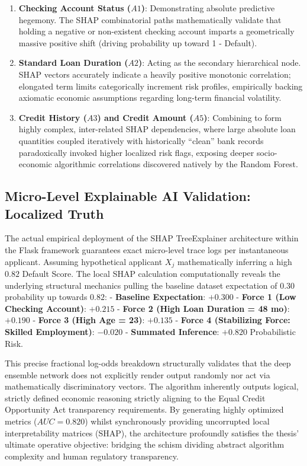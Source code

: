 \begin{enumerate}
\def\labelenumi{\arabic{enumi}.}
\tightlist
\item
  \textbf{Checking Account Status (\(A1\))}: Demonstrating absolute
  predictive hegemony. The SHAP combinatorial paths mathematically
  validate that holding a negative or non-existent checking account
  imparts a geometrically massive positive shift (driving probability up
  toward 1 - Default).
\item
  \textbf{Standard Loan Duration (\(A2\))}: Acting as the secondary
  hierarchical node. SHAP vectors accurately indicate a heavily positive
  monotonic correlation; elongated term limits categorically increment
  risk profiles, empirically backing axiomatic economic assumptions
  regarding long-term financial volatility.
\item
  \textbf{Credit History (\(A3\)) and Credit Amount (\(A5\))}: Combining
  to form highly complex, inter-related SHAP dependencies, where large
  absolute loan quantities coupled iteratively with historically
  ``clean'' bank records paradoxically invoked higher localized risk
  flags, exposing deeper socio-economic algorithmic correlations
  discovered natively by the Random Forest.
\end{enumerate}

\hypertarget{micro-level-explainable-ai-validation-localized-truth}{%
\subsection{Micro-Level Explainable AI Validation: Localized
Truth}\label{micro-level-explainable-ai-validation-localized-truth}}

The actual empirical deployment of the SHAP TreeExplainer architecture
within the Flask framework guarantees exact micro-level trace logs per
instantaneous applicant. Assuming hypothetical applicant \(X_j\)
mathematically inferring a high \(0.82\) Default Score. The local SHAP
calculation computationally reveals the underlying structural mechanics
pulling the baseline dataset expectation of \(0.30\) probability up
towards \(0.82\): - \textbf{Baseline Expectation}: \(+0.300\) -
\textbf{Force 1 (Low Checking Account)}: \(+0.215\) - \textbf{Force 2
(High Loan Duration = 48 mo)}: \(+0.190\) - \textbf{Force 3 (High Age =
23)}: \(+0.135\) - \textbf{Force 4 (Stabilizing Force: Skilled
Employment)}: \(-0.020\) - \textbf{Summated Inference}: \(+0.820\)
Probabilistic Risk.

This precise fractional log-odds breakdown structurally validates that
the deep ensemble network does not explicitly render output randomly nor
act via mathematically discriminatory vectors. The algorithm inherently
outputs logical, strictly defined economic reasoning strictly aligning
to the Equal Credit Opportunity Act transparency requirements. By
generating highly optimized metrics (\(AUC = 0.820\)) whilst
synchronously providing uncorrupted local interpretability matrices
(SHAP), the architecture profoundly satisfies the thesis' ultimate
operative objective: bridging the schism dividing abstract algorithm
complexity and human regulatory transparency.


